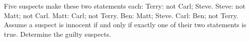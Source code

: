 Five suspects make these two statements each: Terry: not Carl; Steve. Steve: not Matt; not Carl. Matt: Carl; not Terry. Ben: Matt; Steve. Carl: Ben; not Terry. Assume a suspect is innocent if and only if exactly one of their two statements is true. Determine the guilty suspects.
